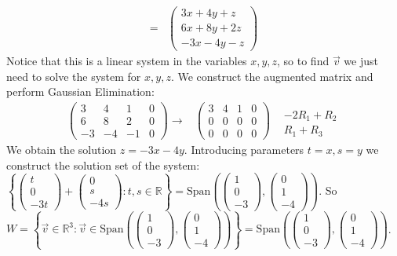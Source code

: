 \documentclass[12pt]{article}
\newenvironment{problem}[2][Problem]
{
	\begin{trivlist} 
		\item[\hskip \labelsep {\bfseries #1 #2:}]
	}
{
	\end{trivlist}
	}
\newenvironment{solution}[1][Solution]
{
	\begin{trivlist} 
		\item[\hskip \labelsep {\itshape #1:}]
	}
	{
	\end{trivlist}
}
\begin{document}
\begin{problem}{5}
\begin{solution}
\begin{align*}
=& \begin{pmatrix}3x+4y+z\\6x+8y+2z\\-3x-4y-z \end{pmatrix}
\end{align*}
Notice that this is a linear system in the variables $x,y,z$, so to find $\vec{v}$ we just need to solve the system for $x,y,z$. We construct the augmented matrix and perform Gaussian Elimination:
\begin{align*}
\begin{pmatrix} 3&4&1&0\\6&8&2&0\\-3&-4&-1&0\end{pmatrix} \rightarrow & \begin{pmatrix} 3&4&1&0\\0&0&0&0\\0&0&0&0\end{pmatrix} &\begin{matrix} \text{} \\ -2R_1+R_2\text{} \\ R_1+R_3 \text{} \end{matrix}
\end{align*}
We obtain the solution $z=-3x-4y$. Introducing parameters $t=x,s=y$ we construct the solution set of the system: $\left\{ \begin{pmatrix}t\\0\\-3t\end{pmatrix} +  \begin{pmatrix} 0\\s\\-4s\end{pmatrix}: t,s \in \mathbb{R} \right\} = \text{Span}\left( \begin{pmatrix}1\\0\\-3\end{pmatrix}, \begin{pmatrix} 0\\1\\-4\end{pmatrix} \right)$. So $W = \left\{ \vec{v} \in \mathbb{R}^3: \vec{v} \in \text{Span}\left( \begin{pmatrix}1\\0\\-3\end{pmatrix}, \begin{pmatrix} 0\\1\\-4\end{pmatrix} \right) \right\} = \text{Span}\left( \begin{pmatrix}1\\0\\-3\end{pmatrix}, \begin{pmatrix} 0\\1\\-4\end{pmatrix} \right)$.

\end{solution}
\end{problem}
\end{document}
